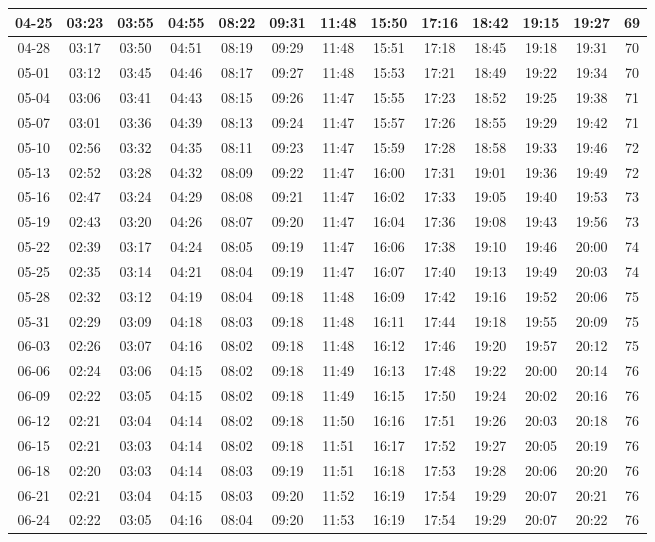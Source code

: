 \begin{footnotesize}
\begin{longtable}{c | c | c | c | c | c | c | c | c | c | c | c | c}
		04-25&03:23&03:55&04:55&08:22&09:31&11:48&15:50&17:16&18:42&19:15&19:27&69\\\hline
		04-28&03:17&03:50&04:51&08:19&09:29&11:48&15:51&17:18&18:45&19:18&19:31&70\\\hline
		05-01&03:12&03:45&04:46&08:17&09:27&11:48&15:53&17:21&18:49&19:22&19:34&70\\\hline
		05-04&03:06&03:41&04:43&08:15&09:26&11:47&15:55&17:23&18:52&19:25&19:38&71\\\hline
		05-07&03:01&03:36&04:39&08:13&09:24&11:47&15:57&17:26&18:55&19:29&19:42&71\\\hline
		05-10&02:56&03:32&04:35&08:11&09:23&11:47&15:59&17:28&18:58&19:33&19:46&72\\\hline
		05-13&02:52&03:28&04:32&08:09&09:22&11:47&16:00&17:31&19:01&19:36&19:49&72\\\hline
		05-16&02:47&03:24&04:29&08:08&09:21&11:47&16:02&17:33&19:05&19:40&19:53&73\\\hline
		05-19&02:43&03:20&04:26&08:07&09:20&11:47&16:04&17:36&19:08&19:43&19:56&73\\\hline
		05-22&02:39&03:17&04:24&08:05&09:19&11:47&16:06&17:38&19:10&19:46&20:00&74\\\hline
		05-25&02:35&03:14&04:21&08:04&09:19&11:47&16:07&17:40&19:13&19:49&20:03&74\\\hline
		05-28&02:32&03:12&04:19&08:04&09:18&11:48&16:09&17:42&19:16&19:52&20:06&75\\\hline
		05-31&02:29&03:09&04:18&08:03&09:18&11:48&16:11&17:44&19:18&19:55&20:09&75\\\hline
		06-03&02:26&03:07&04:16&08:02&09:18&11:48&16:12&17:46&19:20&19:57&20:12&75\\\hline
		06-06&02:24&03:06&04:15&08:02&09:18&11:49&16:13&17:48&19:22&20:00&20:14&76\\\hline
		06-09&02:22&03:05&04:15&08:02&09:18&11:49&16:15&17:50&19:24&20:02&20:16&76\\\hline
		06-12&02:21&03:04&04:14&08:02&09:18&11:50&16:16&17:51&19:26&20:03&20:18&76\\\hline
		06-15&02:21&03:03&04:14&08:02&09:18&11:51&16:17&17:52&19:27&20:05&20:19&76\\\hline
		06-18&02:20&03:03&04:14&08:03&09:19&11:51&16:18&17:53&19:28&20:06&20:20&76\\\hline
		06-21&02:21&03:04&04:15&08:03&09:20&11:52&16:19&17:54&19:29&20:07&20:21&76\\\hline
		06-24&02:22&03:05&04:16&08:04&09:20&11:53&16:19&17:54&19:29&20:07&20:22&76\\\hline

\end{longtable}
\end{footnotesize}
